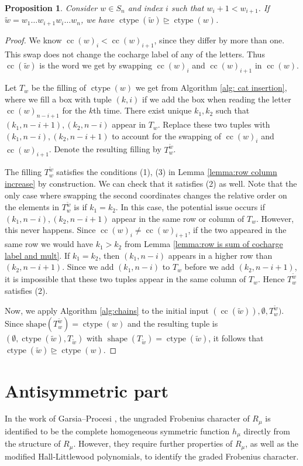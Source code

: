 \documentclass[10pt]{amsart}
\theoremstyle{plain}
\theoremstyle{definition}
\theoremstyle{plain}
\theoremstyle{plain}
\newtheorem{prop}[prop]{Proposition}
\theoremstyle{remark}
\theoremstyle{plain}
\theoremstyle{plain}
\DeclareMathOperator{\ctype}{ctype}
\DeclareMathOperator{\shape}{shape}
\DeclareMathOperator{\cc}{cc}
\begin{document}
\begin{prop}\label{prop: swaps raise ctype}
   Consider $w\in S_n$ and index $i$ such that $w_i  +1 < w_{i+1}$. If $\tilde{w} = w_1\dots w_{i+1}w_i\dots w_n$, we have $\ctype(\tilde{w}) \unrhd \ctype(w)$.
\end{prop}
\begin{proof}
    We know  $\cc(w)_i < \cc(w)_{i+1}$, since they differ by more than one. This swap does not change the cocharge label of any of the letters. 
    Thus $\cc(\tilde{w})$ is the word we get by swapping $\cc(w)_i$ and $\cc(w)_{i+1}$ in $\cc(w)$.

    Let $T_w$ be the filling of $\ctype(w)$ we get from Algorithm \ref{alg: cat insertion}, where we fill a box with tuple $(k,i)$ if we add the box when reading the letter $\cc(w)_{n-i + 1}$ for the $k$th time. There exist unique $k_1,k_2$ such that $(k_1,n-i+1), (k_2,n-i)$ appear in $T_w$. Replace these two tuples with  $(k_1,n-i), (k_2,n-i+1)$ to account for the swapping of $\cc(w)_i$ and $\cc(w)_{i+1}$. Denote the resulting filling by $T_{w}^{\tilde{w}}$.

    The filling $T_{w}^{\tilde{w}}$ satisfies the conditions (1), (3) in Lemma \ref{lemma:row column increase} by construction. We can check that it satisfies (2) as well. 
    Note that the only case where swapping the second coordinates changes the relative order on the elements in $T_{w}^{\tilde{w}}$ is if $k_1 = k_2$. 
    In this case, the potential issue occurs if $(k_1,n-i), (k_2,n-i+1)$ appear in the same row or column of $T_w$.
    However, this never happens. Since $\cc(w)_i \neq \cc(w)_{i+1}$, if the two appeared in the same row we would have $k_1 > k_2$ from Lemma \ref{lemma:row is sum of cocharge label and mult}.
    If $k_1 = k_2$, then $(k_1,n-i)$ appears in a higher row than $ (k_2,n-i+1)$. Since we add $(k_1,n-i)$ to $T_w$ before we add $(k_2,n-i+1)$, it is impossible that these two tuples appear in the same column of $T_w$. Hence $T_{w}^{\tilde{w}}$ satisfies (2).

    Now, we apply Algorithm \ref{alg:chains} to the initial input $(\cc(\tilde{w})), \emptyset, T_{w}^{\tilde{w}})$. 
    Since $\text{shape}(T_{w}^{\tilde{w}}) = \ctype(w)$ and the resulting tuple is $(\emptyset, \ctype(\tilde{w}), T_{\tilde{w}})$ with $\shape (T_{\tilde{w}}) = \ctype(\tilde{w})$, it follows that $\ctype(\tilde{w}) \unrhd \ctype(w)$. 
\end{proof}


\section{Antisymmetric part}\label{sec: remarks}
In the work of Garsia--Procesi \cite[Section 3]{GP}, the ungraded Frobenius character of $R_\mu$ is identified to be the complete homogeneous symmetric function $h_\mu$ directly from the structure of $R_\mu$. 
However, they require further properties of $R_\mu$, as well as the modified Hall-Littlewood polynomials, to identify the graded Frobenius character. 
\end{document}
